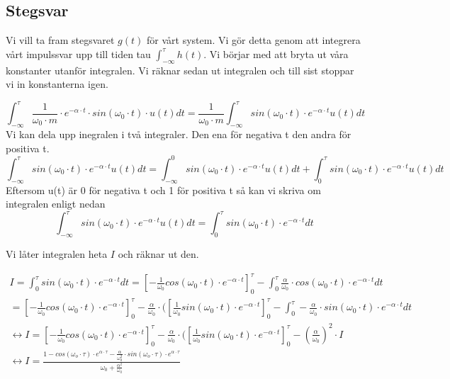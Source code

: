 \documentclass[10pt,a4paper]{article}
\begin{document}
\newpage

\subsection{Stegsvar}

Vi vill ta fram stegsvaret $g(t)$ för vårt system. Vi gör detta genom att integrera vårt impulssvar upp till tiden tau $\int_{-\infty}^\tau h(t)$. Vi börjar med att bryta ut våra konstanter utanför integralen. Vi räknar sedan ut integralen och till sist stoppar vi in konstanterna igen.

\begin{equation}
\int_{-\infty}^\tau \frac{1} {\omega_0 \cdot m} \cdot e^{-\alpha \cdot t} \cdot sin(\omega_0 \cdot t) \cdot u(t) dt = \frac{1}{\omega_0 \cdot m} \int_{-\infty}^\tau sin(\omega_0 \cdot t)\cdot e^{-\alpha \cdot t} u(t) dt
\end{equation}
Vi kan dela upp inegralen i två integraler. Den ena för negativa t den andra för positiva t.
$$ \int_{-\infty}^\tau sin(\omega_0 \cdot t)\cdot e^{-\alpha \cdot t} u(t) dt
= \int_{-\infty}^0 sin(\omega_0 \cdot t)\cdot e^{-\alpha \cdot t} u(t) dt + \int_0^\tau sin(\omega_0 \cdot t)\cdot e^{-\alpha \cdot t} u(t) dt $$
Eftersom u(t) är 0 för negativa t och 1 för positiva t så kan vi skriva om integralen enligt nedan
\begin{equation}
\int_{-\infty}^\tau sin(\omega_0 \cdot t)\cdot e^{-\alpha \cdot t} u(t) dt
= \int_0^\tau sin(\omega_0 \cdot t)\cdot e^{-\alpha \cdot t} dt
\end{equation}

Vi låter integralen heta $I$ och räknar ut den.

\begin{multline} I = \int_0^\tau sin(\omega_0 \cdot t)\cdot e^{-\alpha \cdot t} dt 
= [-\frac{1}{\omega_0} cos(\omega_0 \cdot t) \cdot e^{-\alpha \cdot t}]_0^\tau - \int_0^\tau \frac{\alpha}{\omega_0} \cdot cos(\omega_0 \cdot t) \cdot e^{-\alpha \cdot t} dt \\
 = [-\frac{1}{\omega_0} cos(\omega_0 \cdot t) \cdot e^{-\alpha \cdot t}]_0^\tau - \frac{\alpha}{\omega_0} \cdot ([\frac{1}{\omega_0} sin(\omega_0 \cdot t) \cdot e^{-\alpha \cdot t}]_0^\tau - \int_0^\tau -\frac{\alpha}{\omega_0} \cdot sin(\omega_0 \cdot t)\cdot e^{-\alpha \cdot t} dt \\
\leftrightarrow
I = [-\frac{1}{\omega_0} cos(\omega_0 \cdot t) \cdot e^{-\alpha \cdot t}]_0^\tau - \frac{\alpha}{\omega_0} \cdot ([\frac{1}{\omega_0} sin(\omega_0 \cdot t) \cdot e^{-\alpha \cdot t}]_0^\tau - (\frac{\alpha}{\omega_0})^2 \cdot I \\
\leftrightarrow I = \frac{1-cos(\omega_o \cdot \tau) \cdot e^{\alpha \cdot \tau} - \frac{\alpha}{\omega_0^2} \cdot sin(\omega_o \cdot \tau) \cdot e^{\alpha \cdot \tau}}{\omega_0 + \frac{\alpha^2}{\omega_0}}
\end{multline}
\end{document}
